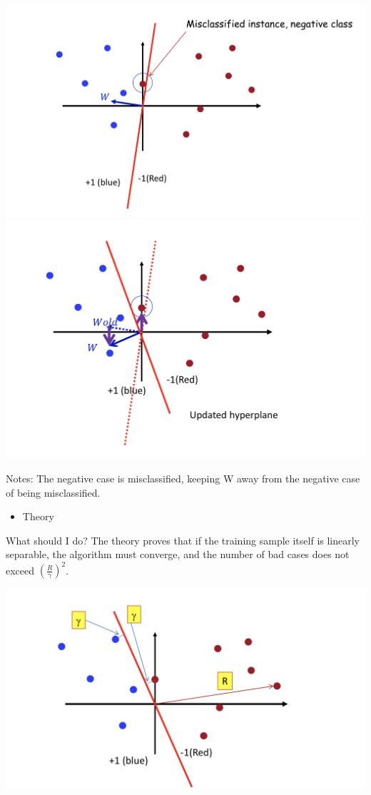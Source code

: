 \documentclass{article}
\begin{document}
	\includegraphics[scale=0.2]{48.png}
	\includegraphics[scale=0.2]{49.png}
	
	Notes: The negative case is misclassified, keeping W away from the negative case of being misclassified.
	
	
	\begin{itemize}
		\item Theory
	\end{itemize}
	
	 What should I do? The theory proves that if the training sample itself is linearly separable, the algorithm must converge, and the number of bad cases does not exceed $(\frac{R}{\gamma})^2$.
	
	\includegraphics[scale=0.2]{50.png}
	
\end{document}
